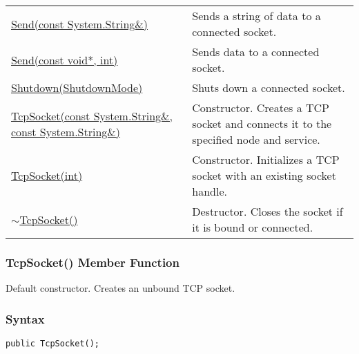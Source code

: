 \documentclass[a4paper,oneside,11.000000pt]{book}
\begin{document}
\begin{flushleft}
\begin{supertabular}[l]{!{\raggedright}p{7.575cm}!{\raggedright}p{7.575cm}}
\\
\hyperlink{System.Net.Sockets.TcpSocket.Send.P.System.Net.Sockets.TcpSocket.C.R.System.String}{Send(const System.\-String\&\-)}
& Sends a string of data to a connected socket.

\\
\hyperlink{System.Net.Sockets.TcpSocket.Send.P.System.Net.Sockets.TcpSocket.C.P.void.int}{Send(const void*, int)}
& Sends data to a connected socket.

\\
\hyperlink{System.Net.Sockets.TcpSocket.Shutdown.P.System.Net.Sockets.TcpSocket.ShutdownMode}{Shutdown(ShutdownMode)}
& Shuts down a connected socket.

\\
\hyperlink{System.Net.Sockets.TcpSocket.constructor.P.System.Net.Sockets.TcpSocket.C.R.System.String.C.R.System.String}{TcpSocket(const System.\-String\&\-, const System.\-String\&\-)}
& Constructor. Creates a TCP socket and connects it to the specified node and service.

\\
\hyperlink{System.Net.Sockets.TcpSocket.constructor.P.System.Net.Sockets.TcpSocket.int}{TcpSocket(int)}
& Constructor. Initializes a TCP socket with an existing socket handle.

\\
\hyperlink{System.Net.Sockets.TcpSocket.destructor.P.System.Net.Sockets.TcpSocket}{$\sim$TcpSocket()}
& Destructor. Closes the socket if it is bound or connected.

\\
\end{supertabular}

\end{flushleft}
\clearpage

\hypertarget{System.Net.Sockets.TcpSocket.constructor.P.System.Net.Sockets.TcpSocket}{\subsubsection*{TcpSocket() Member Function}}
\begin{flushleft}
Default constructor. Creates an unbound TCP socket.

\end{flushleft}
\subsubsection*{Syntax}\texttt{public TcpSocket();}
\clearpage
\end{document}
